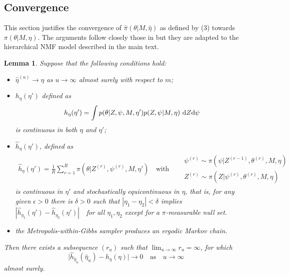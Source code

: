 \documentclass[11pt]{amsart}
\newtheorem{lemma}{Lemma}
\theoremstyle{definition}
\begin{document}
\subsection{Convergence}
This section justifies the convergence of $\widehat\pi(\theta|M,
\hat\eta)$ as defined by (3) towards $\pi(\theta|M, \eta)$. The
arguments follow closely those in \cite{C01} but they are
adapted to the hierarchical NMF model described in the main text.
\begin{lemma}\label{lem:technical} Suppose that the following
  conditions hold:
\begin{itemize}
 \item[(i)] $\hat\eta^{(u)} \to \eta$ as $u \to \infty$ almost
   surely with respect to $m$; 
 \item[(ii)] $h_\eta(\eta')$ defined as
\[
  h_{\eta}(\eta') 
   = 
 \int p(\theta|Z, \psi, M, \eta')p(Z, \psi|M, \eta)\
 \textup{d} Z \textup{d} \psi
\]
is continuous in both $\eta$ and $\eta'$;
\item[(iii)] $\widehat h_\eta(\eta')$, defined as
\begin{align*}
  \widehat h_\eta(\eta') 
  = 
 \frac{1}{R}\sum_{r=1}^R \pi(\theta|Z^{(r)}, \psi^{(r)}, M, \eta')
    \quad \text{with}\quad 
   \begin{aligned}
      &\psi^{(r)} \sim \pi(\psi|Z^{(r-1)}, \theta^{(r)}, M, \eta)\\
      &Z^{(r)} \sim \pi(Z| \psi^{(r)}, \theta^{(r)}, M, \eta) 
   \end{aligned}
\end{align*}
 is continuous in $\eta'$ and stochastically equicontinuous in $\eta$,
that is, for any given $\epsilon > 0$ there is $\delta>0$ such that
$|\eta_1 - \eta_2| < \delta$ implies $|\widehat h_{\eta_1}(\eta') -
\widehat h_{\eta_2}(\eta')|$\ \ for all $\eta_1, \eta_2$ except for a
$\pi$-measurable null set.
 \item[(iv)] the Metropolis-within-Gibbs sampler produces an ergodic
   Markov chain. 
\end{itemize}
Then there exists a subsequence $(r_u)$ such that $\lim_{u\to\infty}
r_u  = \infty$, for which
\[
   \big|\widehat h_{\hat\eta_u}(\hat\eta_u) - h_\eta(\eta)\big| \to 0 
  \quad\text{as}\quad 
   u \to \infty
\]
almost surely. %
\end{lemma} 
\end{document}
